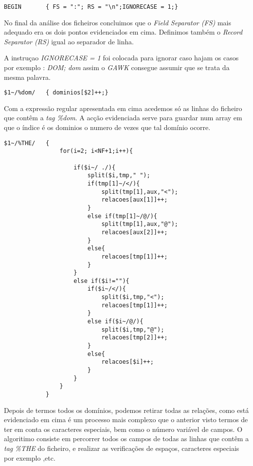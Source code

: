 \documentclass{report}
\begin{document}
\bigskip

\begin{verbatim}
BEGIN       { FS = ":"; RS = "\n";IGNORECASE = 1;}
\end{verbatim}

    No final da análise dos ficheiros concluimos que o \textit{Field Separator (FS)} mais adequado era os dois pontos evidenciados em cima. Definimos também o \textit{Record Separator (RS)} igual ao separador de linha. 

    A instruçao \textit{IGNORECASE = 1} foi colocada para ignorar caso hajam os casos por exemplo : \textit{DOM; dom} assim o  \textit{GAWK} consegue assumir que se trata da mesma palavra.
 

\begin{verbatim}
$1~/%dom/   { dominios[$2]++;}
\end{verbatim}
    
    Com a expressão regular apresentada em cima acedemos só as linhas do ficheiro que contêm a \textit{tag \%dom}. 
    A acção evidenciada serve para guardar num array em que o índice é os dominios o numero de vezes que tal domínio ocorre. 

\begin{verbatim}
$1~/%THE/   {
                for(i=2; i<NF+1;i++){
                    
                    if($i~/ ./){
                        split($i,tmp," ");
                        if(tmp[1]~/</){
                            split(tmp[1],aux,"<");
                            relacoes[aux[1]]++;
                        } 
                        else if(tmp[1]~/@/){
                            split(tmp[1],aux,"@");
                            relacoes[aux[2]]++;
                        }
                        else{
                            relacoes[tmp[1]]++;
                        }
                    }
                    else if($i!=""){
                        if($i~/</){
                            split($i,tmp,"<");
                            relacoes[tmp[1]]++;
                        }
                        else if($i~/@/){
                            split($i,tmp,"@");
                            relacoes[tmp[2]]++;
                        }
                        else{ 
                            relacoes[$i]++;
                        }
                    }
                }
            }
\end{verbatim}
    
    Depois de termos todos os domínios, podemos retirar todas as relações, como está evidenciado em cima é um processo mais complexo que o anterior visto termos de ter em conta os caracteres especiais, bem como o número variável de campos.
    O algoritimo consiste em percorrer todos os campos de todas as linhas que contêm a \textit{tag \%THE} do ficheiro, e realizar as verificações de espaços, caracteres especiais por exemplo \<,etc.
    
\end{document}
